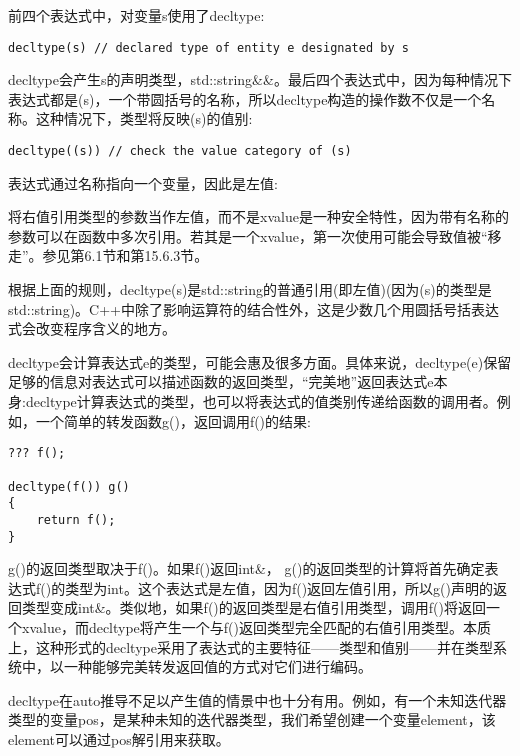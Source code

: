 前四个表达式中，对变量s使用了decltype:

\begin{lstlisting}[style=styleCXX]
decltype(s) // declared type of entity e designated by s
\end{lstlisting}

decltype会产生s的声明类型，std::string\&\&。最后四个表达式中，因为每种情况下表达式都是(s)，一个带圆括号的名称，所以decltype构造的操作数不仅是一个名称。这种情况下，类型将反映(s)的值别:

\begin{lstlisting}[style=styleCXX]
decltype((s)) // check the value category of (s)
\end{lstlisting}

表达式通过名称指向一个变量，因此是左值:

\begin{tcolorbox}[colback=webgreen!5!white,colframe=webgreen!75!black]
\hspace*{0.75cm}将右值引用类型的参数当作左值，而不是xvalue是一种安全特性，因为带有名称的参数可以在函数中多次引用。若其是一个xvalue，第一次使用可能会导致值被“移走”。参见第6.1节和第15.6.3节。
\end{tcolorbox}

根据上面的规则，decltype(s)是std::string的普通引用(即左值)(因为(s)的类型是std::string)。C++中除了影响运算符的结合性外，这是少数几个用圆括号括表达式会改变程序含义的地方。

decltype会计算表达式e的类型，可能会惠及很多方面。具体来说，decltype(e)保留足够的信息对表达式可以描述函数的返回类型，“完美地”返回表达式e本身:decltype计算表达式的类型，也可以将表达式的值类别传递给函数的调用者。例如，一个简单的转发函数g()，返回调用f()的结果:

\begin{lstlisting}[style=styleCXX]
??? f();

decltype(f()) g()
{
	return f();
}
\end{lstlisting}

g()的返回类型取决于f()。如果f()返回int\&， g()的返回类型的计算将首先确定表达式f()的类型为int。这个表达式是左值，因为f()返回左值引用，所以g()声明的返回类型变成int\&。类似地，如果f()的返回类型是右值引用类型，调用f()将返回一个xvalue，而decltype将产生一个与f()返回类型完全匹配的右值引用类型。本质上，这种形式的decltype采用了表达式的主要特征——类型和值别——并在类型系统中，以一种能够完美转发返回值的方式对它们进行编码。

decltype在auto推导不足以产生值的情景中也十分有用。例如，有一个未知迭代器类型的变量pos，是某种未知的迭代器类型，我们希望创建一个变量element，该element可以通过pos解引用来获取。

